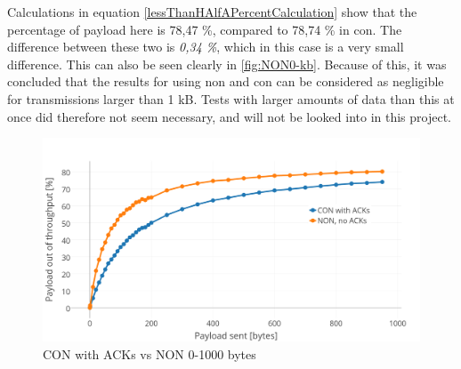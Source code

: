 \noindent Calculations in equation \ref{lessThanHAlfAPercentCalculation} show that the percentage of \gls{payload} here is 78,47 \%, compared to 78,74 \% in \gls{con}. The difference between these two is \textit{0,34 \%}, which in this case is a very small difference. This can also be seen clearly in \ref{fig:NON0-kb}. Because of this, it was concluded that the results for using \gls{non} and \gls{con} can be considered as negligible for transmissions larger than 1 kB. Tests with larger amounts of data than this at once did therefore not seem necessary, and will not be looked into in this project. 



\begin{figure}[ht]
    \centering
    \includegraphics[width=1.0\textwidth]{CONNON0-kwithACK.png}    
    \caption{CON with ACKs vs NON 0-1000 bytes}
    \label{fig:NON0-kb2}
\end{figure}


